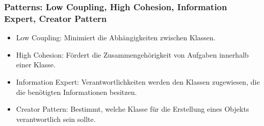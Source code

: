 \documentclass[main.tex]{subfiles}
\begin{document}
\subsubsection*{Patterns:  \gls{Low Coupling}, \gls{High Cohesion}, \gls{Information Expert}, Creator Pattern}
\begin{itemize}
    \item  \gls{Low Coupling}: Minimiert die Abhängigkeiten zwischen Klassen.
    \item \gls{High Cohesion}: Fördert die Zusammengehörigkeit von Aufgaben innerhalb einer Klasse.
    \item \gls{Information Expert}: Verantwortlichkeiten werden den Klassen zugewiesen, die die benötigten Informationen besitzen.
    \item Creator Pattern: Bestimmt, welche Klasse für die Erstellung eines Objekts verantwortlich sein sollte.
\end{itemize}
\end{document}
